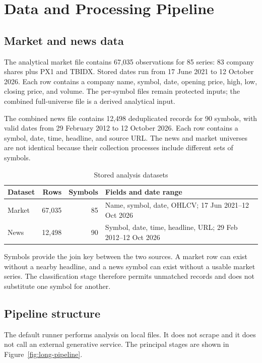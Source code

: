 \chapter{Data and Processing Pipeline}

\section{Market and news data}

The analytical market file contains 67,035 observations for 85 series: 83 company shares plus PX1 and TBIDX. Stored
dates run from 17 June 2021 to 12 October 2026. Each row contains a company
name, symbol, date, opening price, high, low, closing price, and volume. The
per-symbol files remain protected inputs; the combined full-universe file is a
derived analytical input.

The combined news file contains 12,498 deduplicated records for 90 symbols,
with valid dates from 29 February 2012 to 12 October 2026. Each row contains a
symbol, date, time, headline, and source URL. The news and market universes are
not identical because their collection processes include different sets of
symbols.

\begin{table}[htbp]
\centering
\caption{Stored analysis datasets}
\begin{tabularx}{0.94\textwidth}{@{}lrrX@{}}
\toprule
Dataset & Rows & Symbols & Fields and date range \\
\midrule
Market & 67,035 & 85 & Name, symbol, date, OHLCV; 17 Jun 2021--12 Oct 2026 \\
News & 12,498 & 90 & Symbol, date, time, headline, URL; 29 Feb 2012--12 Oct 2026 \\
\bottomrule
\end{tabularx}
\end{table}

Symbols provide the join key between the two sources. A market row can exist
without a nearby headline, and a news symbol can exist without a usable market
series. The classification stage therefore permits unmatched records and does
not substitute one symbol for another.

\section{Pipeline structure}

The default runner performs analysis on local files. It does not scrape and it
does not call an external generative service. The principal stages are shown
in Figure~\ref{fig:long-pipeline}.

